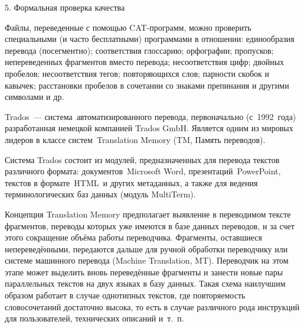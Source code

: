 5. Формальная проверка качества

Файлы, переведенные с помощью CAT-программ, можно проверить специальными (и часто бесплатными) программами в отношении: единообразия перевода (посегментно); соответствия глоссарию; орфографии; пропусков; непереведенных фрагментов вместо перевода; несоответствия цифр; двойных пробелов; несоответствия тегов; повторяющихся слов; парности скобок и кавычек; расстановки пробелов в сочетании со знаками препинания и другими символами и др.

Trados --- система автоматизированного перевода, первоначально (с 1992 года) разработанная немецкой компанией Trados GmbH. Является одним из мировых лидеров в классе систем Translation Memory (TM, Память переводов).

Система Trados состоит из модулей, предназначенных для перевода текстов различного формата: документов Microsoft Word, презентаций PowerPoint, текстов в формате HTML и других метаданных, а также для ведения терминологических баз данных (модуль MultiTerm).

Концепция Translation Memory предполагает выявление в переводимом тексте фрагментов, переводы которых уже имеются в базе данных переводов, и за счет этого сокращение объёма работы переводчика. Фрагменты, оставшиеся непереведёнными, передаются дальше для ручной обработки переводчику или системе машинного перевода (Machine Translation, MT). Переводчик на этом этапе может выделить вновь переведённые фрагменты и занести новые пары параллельных текстов на двух языках в базу данных. Такая схема наилучшим образом работает в случае однотипных текстов, где повторяемость словосочетаний достаточно высока, то есть в случае различного рода инструкций для пользователей, технических описаний и т. п.